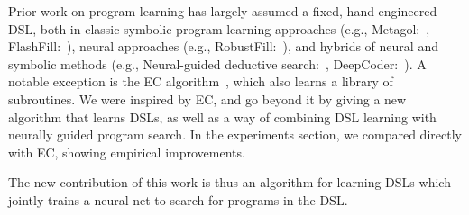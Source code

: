 \documentclass{article}
\newcommand{\probability}{\mathds{P}} %
\begin{document}
Prior work on program learning has largely assumed a fixed, hand-engineered DSL,
both in classic symbolic program learning approaches (e.g., Metagol:~\cite{muggleton2015meta},
FlashFill:~\cite{gulwani2011automating}),
neural approaches  (e.g., RobustFill:~\cite{devlin2017robustfill}), and hybrids of neural and
symbolic methods (e.g., Neural-guided deductive search:~\cite{ngds}, DeepCoder:~\cite{balog2016deepcoder}).
A notable exception is the EC algorithm~\cite{Dechter:2013:BLV:2540128.2540316},
which also learns a library of subroutines.
We were inspired by EC,
and go beyond it by giving a new algorithm that learns DSLs, as well as a way of combining DSL learning with
neurally guided program search.
In the experiments section,
we compared directly with EC,
showing empirical improvements.

The new contribution of this work is
thus an  algorithm for learning DSLs which jointly trains a neural net to
search for programs in the DSL.


 



\end{document}
